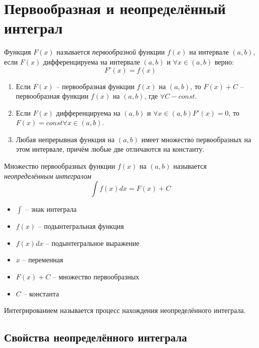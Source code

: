 \section{Первообразная и неопределённый интеграл}

\begin{definition}[Первообразная]
    Функция $F(x)$ называется \textit{первообразной} функции $f(x)$ на интервале $(a, b)$, если $F(x)$ дифференцируема на интервале $(a, b)$ и $\forall x \in (a, b)$ верно: \[
        F'(x) = f(x)
    \]
\end{definition}

\begin{enumerate}
    \item Если $F(x)$ -- первообразная функции $f(x)$ на $(a, b)$, то $F(x) + C$ -- первообразная функции $f(x)$ на $(a, b)$, где $\forall C - const$.
    \item  Если $F(x)$ дифференцируема на $(a, b)$ и $\forall x \in (a, b) F'(x) = 0$, то $F(x) = const \forall x \in (a, b)$.
    \item Любая непрерывная функция на  $(a, b)$  имеет множество первообразных на этом интервале, причём любые две отличаются на константу.
\end{enumerate}

\begin{definition}
    Множество первообразных функции $f(x)$ на $(a, b)$ называется \textit{неопределённым интегралом} \[
        \int f(x)dx = F(x) + C
    \]
\end{definition}

\begin{itemize}
    \item $\int$ -- знак интеграла
    \item $f(x)$ -- подынтегральная функция
    \item $f(x)dx$ -- подынтегральное выражение
    \item $x$ -- переменная
    \item $F(x) + C$ -- множество первообразных
    \item $C$ -- константа
\end{itemize}

\begin{definition}[Интегрирование]
    Интегрированием называется процесс нахождения неопределённого интеграла.
\end{definition}

\subsection{Свойства неопределённого интеграла}

